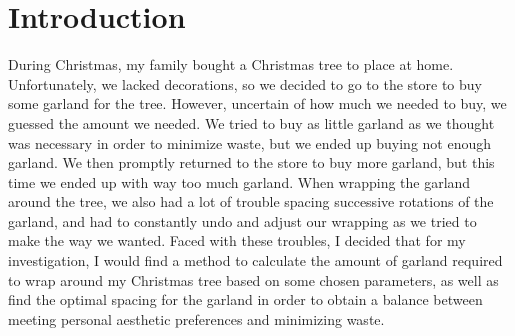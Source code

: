 \section{Introduction}
During Christmas, my family bought a Christmas tree to place at home. Unfortunately, we lacked decorations, so we decided to go to the store to buy some garland for the tree. However, uncertain of how much we needed to buy, we guessed the amount we needed. We tried to buy as little garland as we thought was necessary in order to minimize waste, but we ended up buying not enough garland. We then promptly returned to the store to buy more garland, but this time we ended up with way too much garland. When wrapping the garland around the tree, we also had a lot of trouble spacing successive rotations of the garland, and had to constantly undo and adjust our wrapping as we tried to make the way we wanted. Faced with these troubles, I decided that for my investigation, I would find a method to calculate the amount of garland required to wrap around my Christmas tree based on some chosen parameters, as well as find the optimal spacing for the garland in order to obtain a balance between meeting personal aesthetic preferences and minimizing waste.

